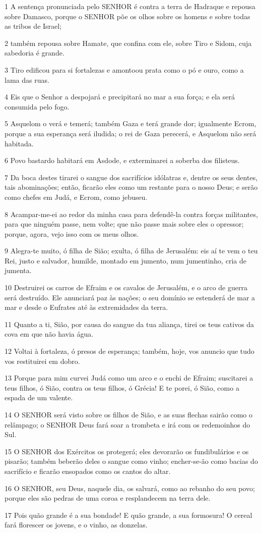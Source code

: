 \par 1 A sentença pronunciada pelo SENHOR é contra a terra de Hadraque e repousa sobre Damasco, porque o SENHOR põe os olhos sobre os homens e sobre todas as tribos de Israel;
\par 2 também repousa sobre Hamate, que confina com ele, sobre Tiro e Sidom, cuja sabedoria é grande.
\par 3 Tiro edificou para si fortalezas e amontoou prata como o pó e ouro, como a lama das ruas.
\par 4 Eis que o Senhor a despojará e precipitará no mar a sua força; e ela será consumida pelo fogo.
\par 5 Asquelom o verá e temerá; também Gaza e terá grande dor; igualmente Ecrom, porque a sua esperança será iludida; o rei de Gaza perecerá, e Asquelom não será habitada.
\par 6 Povo bastardo habitará em Asdode, e exterminarei a soberba dos filisteus.
\par 7 Da boca destes tirarei o sangue dos sacrifícios idólatras e, dentre os seus dentes, tais abominações; então, ficarão eles como um restante para o nosso Deus; e serão como chefes em Judá, e Ecrom, como jebuseu.
\par 8 Acampar-me-ei ao redor da minha casa para defendê-la contra forças militantes, para que ninguém passe, nem volte; que não passe mais sobre eles o opressor; porque, agora, vejo isso com os meus olhos.
\par 9 Alegra-te muito, ó filha de Sião; exulta, ó filha de Jerusalém: eis aí te vem o teu Rei, justo e salvador, humilde, montado em jumento, num jumentinho, cria de jumenta.
\par 10 Destruirei os carros de Efraim e os cavalos de Jerusalém, e o arco de guerra será destruído. Ele anunciará paz às nações; o seu domínio se estenderá de mar a mar e desde o Eufrates até às extremidades da terra.
\par 11 Quanto a ti, Sião, por causa do sangue da tua aliança, tirei os teus cativos da cova em que não havia água.
\par 12 Voltai à fortaleza, ó presos de esperança; também, hoje, vos anuncio que tudo vos restituirei em dobro.
\par 13 Porque para mim curvei Judá como um arco e o enchi de Efraim; suscitarei a teus filhos, ó Sião, contra os teus filhos, ó Grécia! E te porei, ó Sião, como a espada de um valente.
\par 14 O SENHOR será visto sobre os filhos de Sião, e as suas flechas sairão como o relâmpago; o SENHOR Deus fará soar a trombeta e irá com os redemoinhos do Sul.
\par 15 O SENHOR dos Exércitos os protegerá; eles devorarão os fundibulários e os pisarão; também beberão deles o sangue como vinho; encher-se-ão como bacias do sacrifício e ficarão ensopados como os cantos do altar.
\par 16 O SENHOR, seu Deus, naquele dia, os salvará, como ao rebanho do seu povo; porque eles são pedras de uma coroa e resplandecem na terra dele.
\par 17 Pois quão grande é a sua bondade! E quão grande, a sua formosura! O cereal fará florescer os jovens, e o vinho, as donzelas.

